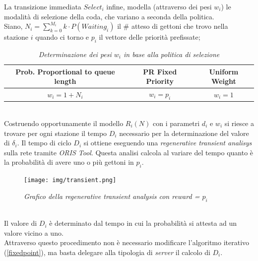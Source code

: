 \documentclass[12pt,a4paper,italian]{article}
\begin{document}
La transizione immediata $Select_i$ infine, modella (attraverso dei pesi $w_i$) le modalità di selezione della coda, che variano a seconda della politica. \\
\newline
Siano, $N_i = \sum_{k=0}^{M_i} k\cdot P(Waiting_i)$ il \# atteso di gettoni che trovo nella stazione $i$ quando ci torno e $p_i$ il vettore delle priorità prefissate;
\begin{table}[ht!]
	\centering
	\begin{tabular}{ccc}
		\hline
		Prob. Proportional to queue length & PR Fixed Priority & Uniform Weight \\ \hline
		$w_i = 1 + N_i$      & $w_i = p_i$  & $w_i = 1$               \\ \hline
	\end{tabular}
	\caption{\emph{Determinazione dei pesi $w_i$ in base alla politica di selezione}}
	\label{weights}
\end{table}\\
Costruendo opportunamente il modello $R_i(N)$ con i parametri $d_i$ e $w_i$ si riesce a trovare per ogni stazione il tempo $D_i$ necessario per la determinazione del valore di $\delta_i$. Il tempo di ciclo $D_i$ si ottiene eseguendo una \emph{regenerative transient analisys} sulla rete tramite \emph{ORIS Tool}. Questa analisi calcola al variare del tempo quanto è la probabilità di avere uno o più gettoni in $p_i$.\\
\begin{figure}[ht!]	
	\centering
	\texttt{[image: img/transient.png]}
	\caption{\emph{Grafico della regenerative transient analysis con reward = $p_i$}}
	\label{transient}
\end{figure}\\
Il valore di $D_i$ è determinato dal tempo in cui la probabilità si attesta ad un valore vicino a uno.\\
Attraverso questo procedimento non è necessario modificare l'algoritmo iterativo (\ref{fixedpoint}), ma basta delegare alla tipologia di \emph{server} il calcolo di $D_i$.
\newpage
\end{document}
